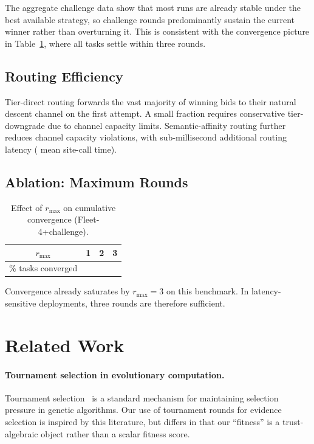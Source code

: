 \documentclass[11pt]{article}
\begin{document}
The aggregate challenge data show that most runs are already stable under the
best available strategy, so challenge rounds predominantly sustain the current
winner rather than overturning it.  This is consistent with the convergence
picture in Table~\ref{tab:rounds}, where all tasks settle within three rounds.

\subsection{Routing Efficiency}

Tier-direct routing forwards the vast majority of winning bids to their
natural descent channel on the first attempt.  A small fraction requires
conservative tier-downgrade due to channel capacity limits.  Semantic-affinity
routing further reduces channel capacity violations, with sub-millisecond
additional routing latency (\subSiteMeanTime{} mean site-call time).

\subsection{Ablation: Maximum Rounds}

\begin{table}[H]
\centering
\caption{Effect of $r_{\max}$ on cumulative convergence (Fleet-4+challenge).}
\label{tab:rounds}
\begin{tabular}{cccc}
\toprule
$r_{\max}$ & 1 & 2 & 3 \\
\midrule
\% tasks converged & \ppSeventeenRoundOneConverge{} & \ppSeventeenRoundTwoConverge{} & \ppSeventeenRoundThreeConverge{} \\
\bottomrule
\end{tabular}
\end{table}

Convergence already saturates by $r_{\max} = 3$ on this benchmark.  In
latency-sensitive deployments, three rounds are therefore sufficient.

\section{Related Work}\label{sec:related}

\paragraph{Tournament selection in evolutionary computation.}
Tournament selection~\cite{Gold89} is a standard mechanism for maintaining
selection pressure in genetic algorithms.  Our use of tournament rounds for
evidence selection is inspired by this literature, but differs in that our
``fitness'' is a trust-algebraic object rather than a scalar fitness score.
\end{document}
